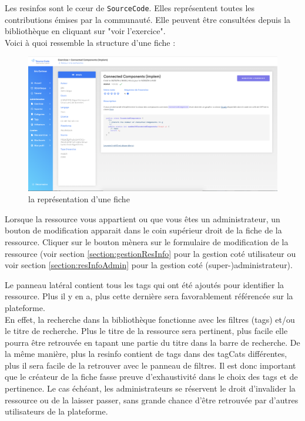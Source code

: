 Les \glspl{resinfo} sont le cœur de \texttt{SourceCode}. Elles représentent toutes les contributions émises par la communauté. Elle peuvent être consultées depuis la bibliothèque en cliquant sur "voir l'exercice".\\

Voici à quoi ressemble la structure d'une \gls{fiche} :

\begin{figure}[H]
    \includegraphics[width=\textwidth,height=\textheight,keepaspectratio]{images/client/fiche.png}
    \centering
    \caption[SourceCode : la représentation d'une \gls{fiche}]{la représentation d'une \gls{fiche}}
\end{figure}

Lorsque la ressource vous appartient ou que vous êtes un administrateur, un bouton de modification apparait dans le coin supérieur droit de la \gls{fiche} de la ressource. Cliquer sur le bouton mènera sur le formulaire de modification de la ressource (voir section \ref{section:gestionResInfo} pour la gestion coté utilisateur ou voir section \ref{section:resInfoAdmin} pour la gestion coté (super-)administrateur).\\


Le panneau latéral contient tous les \glspl{tag} qui ont été ajoutés pour identifier la ressource. Plus il y en a, plus cette dernière sera favorablement référencée sur la plateforme.\\

En effet, la recherche dans la bibliothèque fonctionne avec les filtres (\glspl{tag}) et/ou le titre de recherche. Plus le titre de la ressource sera pertinent, plus facile elle pourra être retrouvée en tapant une partie du titre dans la barre de recherche. 
De la même manière, plus la \gls{resinfo} contient de \glspl{tag} dans des \glspl{tagCat} différentes, plus il sera facile de la retrouver avec le panneau de filtres. Il est donc important que le créateur de la \gls{fiche} fasse preuve d'exhaustivité dans le choix des \glspl{tag} et de pertinence. Le cas échéant, les administrateurs se réservent le droit d'invalider la ressource ou de la laisser passer, sans grande chance d'être retrouvée par d'autres utilisateurs de la plateforme.

